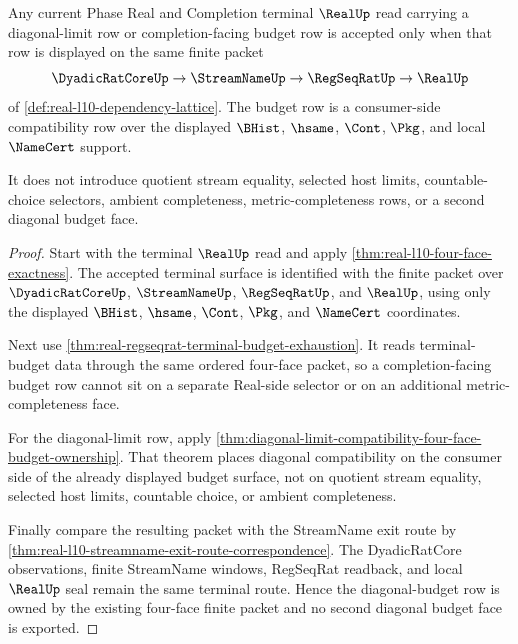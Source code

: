 \begin{theorem}
\label{thm:real-l10-diagonal-budget-four-face-ownership}
Any current Phase Real and Completion terminal $\RealUp$ read carrying a diagonal-limit row or completion-facing budget row is accepted only when that row is displayed on the same finite packet
$$
\DyadicRatCoreUp \to \StreamNameUp \to \RegSeqRatUp \to \RealUp
$$
of \autoref{def:real-l10-dependency-lattice}. The budget row is a consumer-side compatibility row over the displayed $\BHist$, $\hsame$, $\Cont$, $\Pkg$, and local $\NameCert$ support.

It does not introduce quotient stream equality, selected host limits, countable-choice selectors, ambient completeness, metric-completeness rows, or a second diagonal budget face.
\end{theorem}
\begin{proof}
Start with the terminal $\RealUp$ read and apply \autoref{thm:real-l10-four-face-exactness}. The accepted terminal surface is identified with the finite packet over $\DyadicRatCoreUp$, $\StreamNameUp$, $\RegSeqRatUp$, and $\RealUp$, using only the displayed $\BHist$, $\hsame$, $\Cont$, $\Pkg$, and $\NameCert$ coordinates.

Next use \autoref{thm:real-regseqrat-terminal-budget-exhaustion}. It reads terminal-budget data through the same ordered four-face packet, so a completion-facing budget row cannot sit on a separate Real-side selector or on an additional metric-completeness face.

For the diagonal-limit row, apply \autoref{thm:diagonal-limit-compatibility-four-face-budget-ownership}. That theorem places diagonal compatibility on the consumer side of the already displayed budget surface, not on quotient stream equality, selected host limits, countable choice, or ambient completeness.

Finally compare the resulting packet with the StreamName exit route by \autoref{thm:real-l10-streamname-exit-route-correspondence}. The DyadicRatCore observations, finite StreamName windows, RegSeqRat readback, and local $\RealUp$ seal remain the same terminal route. Hence the diagonal-budget row is owned by the existing four-face finite packet and no second diagonal budget face is exported.
\end{proof}

